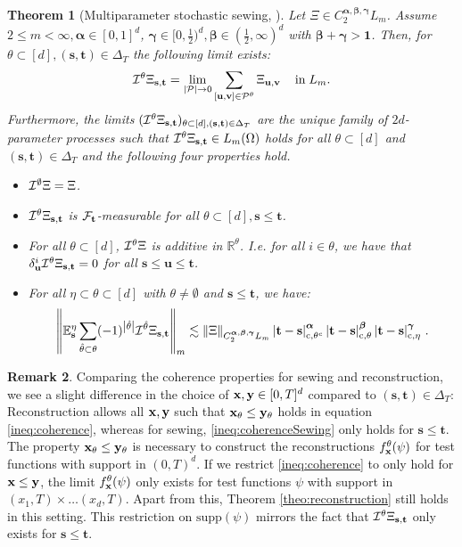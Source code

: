 \documentclass[12pt]{article}
\numberwithin{equation}{section}
\theoremstyle{plain}
\newtheorem{theorem}{Theorem}[section]
\theoremstyle{definition}
\newtheorem{remark}[theorem]{Remark}
\newcommand{\abs}[1]{\left\vert #1 \right\vert}
\newcommand{\norm}[1]{\left\Vert #1\right\Vert}
\def\cP{\mathcal{P}}\def\cQ{\mathcal{Q}}
\def\bR{\mathbb{R}}\def\bS{\mathbb{S}}
\def\bE{\mathbb{E}}\def\bW{\mathbb{W}}
\def\fs{\mathbf s}\def\ft{\mathbf t}
\def\fu{\mathbf u}\def\fv{\mathbf v}
\def\fy{\mathbf y}\def\fz{\mathbf z}
\def\falpha{{\boldsymbol\alpha}}
\def\fbeta{{\boldsymbol\beta}}
\def\fgamma{{\boldsymbol\gamma}}
\def\fone{{\boldsymbol 1}}
\def\supp{\mbox{supp}}
\begin{document}
\begin{theorem}[Multiparameter stochastic sewing, \cite{multiparameterStochSewing}]\label{theo:sewing}
    Let $\Xi\in C_2^{\falpha,\fbeta,\fgamma}L_m$. Assume $2\le m<\infty, \falpha\in[0,1]^d$, $\fgamma\in[0,\frac 12)^d, \fbeta\in(\frac 12,\infty)^d$ with $\fbeta+\fgamma > \fone$. Then, for $\theta\subset[d],(\fs,\ft)\in\Delta_T$ the following limit exists:
    \[
        \cI^\theta\Xi_{\fs,\ft} =\lim_{\abs{\cP}\to 0} \sum_{[\fu,\fv]\in\cP^\theta} \Xi_{\fu,\fv}\,\quad \text{in}\; L_m.
    \]
    Furthermore, the limits $(\cI^\theta\Xi_{\fs,\ft})_{\theta\subset[d],(\fs,\ft)\in\Delta_T}$ are the unique family of $2d$-parameter processes such that $\cI^\theta\Xi_{\fs,\ft}\in L_m(\Omega)$ holds for all $\theta\subset[d]$ and $(\fs,\ft)\in\Delta_T$ and the following four properties hold.
    \begin{itemize}
        \item[i)] $\mathcal{I}^\emptyset\Xi = \Xi$.
        \item[ii)] $\cI^\theta\Xi_{\fs,\ft}$ is $\cF_\ft$-measurable for all $\theta\subset[d], \fs\le\ft$.
        \item[iii)] For all $\theta\subset[d]$, $\mathcal{I}^\theta\Xi$ is additive in $\bR^\theta$. I.e. for all $i\in\theta$, we have that $\delta^i_\fu\cI^\theta\Xi_{\fs,\ft} = 0$ for all $\fs\le\fu\le\ft$.
        \item[iv)] For all $\eta\subset\theta\subset[d]$ with $\theta\neq\emptyset$ and $\fs\le\ft$, we have:
        \begin{equation*}
            \norm{\bE^\eta_\fs\sum_{\hat\theta\subset\theta} (-1)^{\abs{\hat\theta}}\cI^{\hat\theta}\Xi_{\fs,\ft}}_m \lesssim \norm{\Xi}_{C_2^{\falpha,\fbeta,\fgamma}L_m}\abs{\ft-\fs}^{\falpha}_{\text c,\theta^c}\abs{\ft-\fs}^{\fbeta}_{\text c,\theta}\abs{\ft-\fs}^{\fgamma}_{\text c,\eta}\,.
        \end{equation*}
    \end{itemize}
\end{theorem}

\begin{remark}\label{rem:strictlyOrderedSetting}
    Comparing the coherence properties for sewing and reconstruction, we see a slight difference in the choice of $\fx,\fy\in[0,T]^d$ compared to $(\fs,\ft)\in \Delta_T$: Reconstruction allows all $\fx,\fy$ such that $\fx_\theta\le\fy_\theta$ holds in equation \eqref{ineq:coherence}, whereas for sewing, \eqref{ineq:coherenceSewing} only holds for $\fs\le\ft$. The property $\fx_\theta\le\fy_\theta$ is necessary to construct the reconstructions $f_\mathbf x^\theta(\psi)$ for test functions with support in $(0,T)^d$. If we restrict \eqref{ineq:coherence} to only hold for $\fx\le\fy$, the limit $f_\mathbf x^\theta(\psi)$ only exists for test functions $\psi$ with support in $(x_1,T)\times\dots(x_d,T)$. Apart from this, Theorem \ref{theo:reconstruction} still holds in this setting. This restriction on $\supp(\psi)$ mirrors the fact that $\cI^\theta \Xi_{\fs,\ft}$ only exists for $\fs\le\ft$.
\end{remark}
\end{document}
